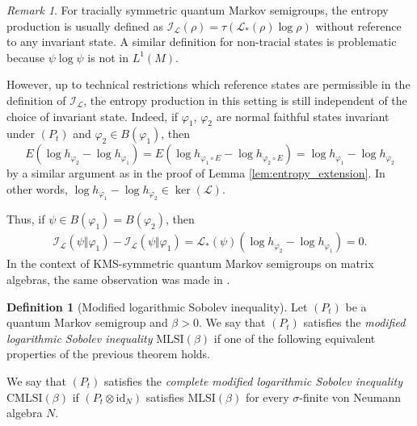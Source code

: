 \documentclass[12pt,a4paper]{amsart}
\newcommand{\1}{\mathds{1}}
\renewcommand{\phi}{\varphi}
\newcommand{\I}{\mathcal I}
\renewcommand{\L}{\mathcal L}
\newcommand{\id}{\mathrm{id}}
\theoremstyle{plain}
\theoremstyle{definition}
\newtheorem{definition}[proposition]{Definition}
\theoremstyle{remark}
\newtheorem{remark}[proposition]{Remark}
\begin{document}
\begin{remark}
For tracially symmetric quantum Markov semigroups, the entropy production is usually defined as $\I_\L(\rho)=\tau(\L_\ast(\rho)\log\rho)$ without reference to any invariant state. A similar definition for non-tracial states is problematic because $\psi\log\psi$ is not in $L^1(M)$.

However, up to technical restrictions which reference states are permissible in the definition of $\I_\L$, the entropy production in this setting is still independent of the choice of invariant state. Indeed, if $\phi_1$, $\phi_2$ are normal faithful states invariant under $(P_t)$ and $\phi_2\in B(\phi_1)$, then 
\begin{equation*}
E(\log h_{\phi_2}-\log h_{\phi_1})=E(\log h_{\phi_1\circ E}-\log h_{\phi_2\circ E})=\log h_{\phi_1}-\log h_{\phi_2}
\end{equation*}
by a similar argument as in the proof of Lemma \ref{lem:entropy_extension}. In other words, $\log h_{\phi_1}-\log h_{\phi_2}\in \ker(\L)$.

Thus, if $\psi\in B(\phi_1)=B(\phi_2)$, then
\begin{align*}
\I_\L(\psi\Vert \phi_1)-\I_\L(\psi\Vert \phi_1)=\L_\ast(\psi)(\log h_{\phi_2}-\log h_{\phi_1})=0.
\end{align*}
In the context of KMS-symmetric quantum Markov semigroups on matrix algebras, the same observation was made in \cite[Lemma 2]{Capel21}.
\end{remark}

\begin{definition}[Modified logarithmic Sobolev inequality]
Let $(P_t)$ be a quantum Markov semigroup and $\beta>0$. We say that $(P_t)$ satisfies the \emph{modified logarithmic Sobolev inequality} $\mathrm{MLSI}(\beta)$ if one of the following equivalent properties of the previous theorem holds.

We say that $(P_t)$ satisfies the \emph{complete modified logarithmic Sobolev inequality} $\mathrm{CMLSI}(\beta)$ if $(P_t\otimes \id_N)$ satisfies $\mathrm{MLSI}(\beta)$ for every $\sigma$-finite von Neumann algebra $N$.
\end{definition}
\end{document}
